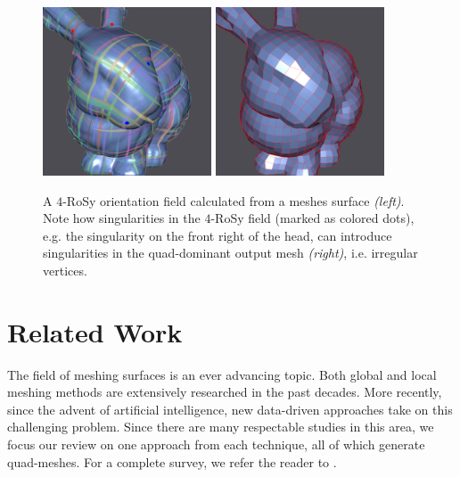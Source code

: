 \documentclass{ACGSeminar}
\begin{document}
\begin{figure}[htb!]
	\begin{centering}
		\includegraphics[width=5cm]{img/n-Rosy-orientation.png} \includegraphics[width=5cm]{img/n-Rosy-Mesh.png}\par
	\end{centering}
	\caption{A $4$-RoSy orientation field calculated from a meshes surface \textit{(left)}. Note how singularities in the $4$-RoSy field (marked as colored dots), e.g. the singularity on the front right of the head, can introduce singularities in the quad-dominant output mesh \textit{(right)}, i.e. irregular vertices.}
	\label{fig:n-rosy-geometry}
\end{figure}



\section{Related Work}\label{related_work}
The field of meshing surfaces is an ever advancing topic. Both global and local meshing methods are extensively researched in the past decades. More recently, since the advent of artificial intelligence, new data-driven approaches take on this challenging problem. Since there are many respectable studies in this area, we focus our review on one approach from each technique, all of which generate quad-meshes. For a complete survey, we refer the reader to \cite{bommes2013quad}.
\end{document}
